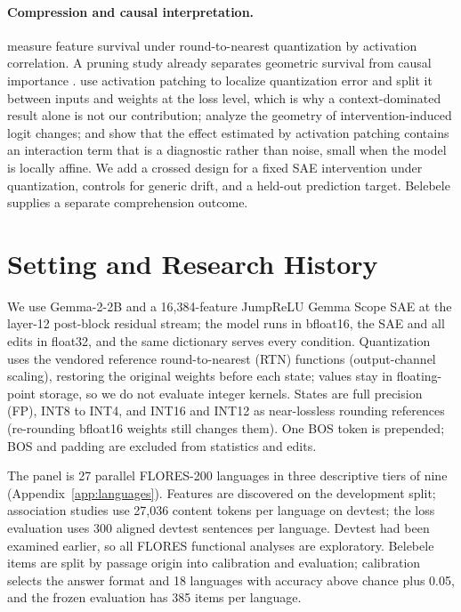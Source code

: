 \paragraph{Compression and causal interpretation.}
\citet{duan2026} measure feature survival under round-to-nearest quantization by activation correlation. A pruning study already separates geometric survival from causal importance \citep{borobia2026}. \citet{chang-etal-2025-inputs} use activation patching to localize quantization error and split it between inputs and weights at the loss level, which is why a context-dominated result alone is not our contribution; \citet{hoang2026} analyze the geometry of intervention-induced logit changes; and \citet{vaidyanathan2026} show that the effect estimated by activation patching contains an interaction term that is a diagnostic rather than noise, small when the model is locally affine. We add a crossed design for a fixed SAE intervention under quantization, controls for generic drift, and a held-out prediction target. Belebele \citep{bandarkar-etal-2024-belebele} supplies a separate comprehension outcome.

\section{Setting and Research History}
We use Gemma-2-2B \citep{gemma2024} and a 16,384-feature JumpReLU \citep{rajamanoharan2024} Gemma Scope SAE at the layer-12 post-block residual stream; the model runs in bfloat16, the SAE and all edits in float32, and the same dictionary serves every condition. Quantization uses the vendored reference round-to-nearest (RTN) functions (output-channel scaling), restoring the original weights before each state; values stay in floating-point storage, so we do not evaluate integer kernels. States are full precision (FP), INT8 to INT4, and INT16 and INT12 as near-lossless rounding references (re-rounding bfloat16 weights still changes them). One BOS token is prepended; BOS and padding are excluded from statistics and edits.

The panel is 27 parallel FLORES-200 \citep{nllb2022} languages in three descriptive tiers of nine (Appendix~\ref{app:languages}). Features are discovered on the development split; association studies use 27,036 content tokens per language on devtest; the loss evaluation uses 300 aligned devtest sentences per language. Devtest had been examined earlier, so all FLORES functional analyses are exploratory. Belebele items are split by passage origin into calibration and evaluation; calibration selects the answer format and 18 languages with accuracy above chance plus 0.05, and the frozen evaluation has 385 items per language.

